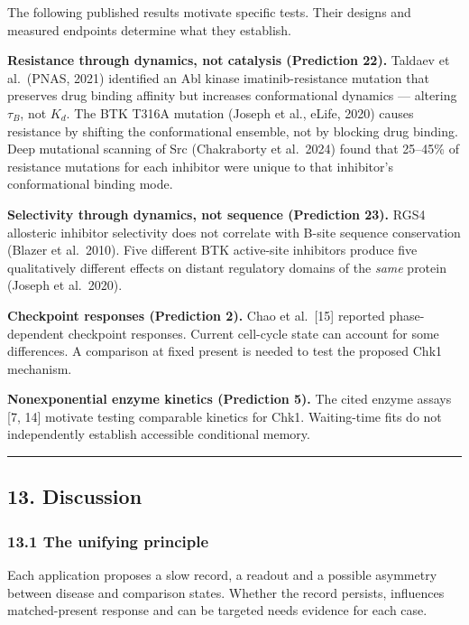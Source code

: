\documentclass[
]{article}
\begin{document}
The following published results motivate specific tests. Their designs
and measured endpoints determine what they establish.

\textbf{Resistance through dynamics, not catalysis (Prediction 22).}
Taldaev et al.~(PNAS, 2021) identified an Abl kinase imatinib-resistance
mutation that preserves drug binding affinity but increases
conformational dynamics --- altering \(\tau_B\), not \(K_d\). The BTK
T316A mutation (Joseph et al., eLife, 2020) causes resistance by
shifting the conformational ensemble, not by blocking drug binding. Deep
mutational scanning of Src (Chakraborty et al.~2024) found that 25--45\%
of resistance mutations for each inhibitor were unique to that
inhibitor's conformational binding mode.

\textbf{Selectivity through dynamics, not sequence (Prediction 23).}
RGS4 allosteric inhibitor selectivity does not correlate with B-site
sequence conservation (Blazer et al.~2010). Five different BTK
active-site inhibitors produce five qualitatively different effects on
distant regulatory domains of the \emph{same} protein (Joseph et
al.~2020).

\textbf{Checkpoint responses (Prediction 2).} Chao et al.~{[}15{]}
reported phase-dependent checkpoint responses. Current cell-cycle state
can account for some differences. A comparison at fixed present is
needed to test the proposed Chk1 mechanism.

\textbf{Nonexponential enzyme kinetics (Prediction 5).} The cited enzyme
assays {[}7, 14{]} motivate testing comparable kinetics for Chk1.
Waiting-time fits do not independently establish accessible conditional
memory.

\begin{center}\rule{0.5\linewidth}{0.5pt}\end{center}

\hypertarget{discussion}{%
\subsection{13. Discussion}\label{discussion}}

\hypertarget{the-unifying-principle}{%
\subsubsection{13.1 The unifying
principle}\label{the-unifying-principle}}

Each application proposes a slow record, a readout and a possible
asymmetry between disease and comparison states. Whether the record
persists, influences matched-present response and can be targeted needs
evidence for each case.
\end{document}

